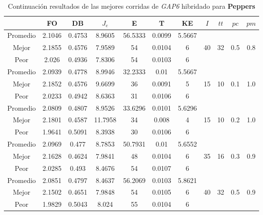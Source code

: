 \begin{table}[h!]
    \footnotesize
    \begin{center}
        \begin{tabular}{|c|c|c|c|c|c|c|c|c|c|c|}
        \hline
             & {\bf FO} & {\bf DB} & $J_e$ & {\bf E} & {\bf T} & {\bf KE} & $I$ & $tt$ & $pc$ & $pm$ \\
        \hline
        \hline
            Promedio  & 2.1046 & 0.4753 & 8.9605 & 56.5333 & 0.0099 & 5.5667 &  &  &  & \\
            \cline{1-7}
            Mejor & 2.1855 & 0.4576  & 7.9589 & 54 & 0.0104 & 6 & 40 & 32 & 0.5 & 0.8\\
            \cline{1-7}
            Peor & 2.026 & 0.4936  & 7.8306 & 54 & 0.0103 & 6 &  &  &  & \\
        \hline
        \hline
            Promedio  & 2.0939 & 0.4778 & 8.9946 & 32.2333 & 0.01 & 5.5667 &  &  &  & \\
            \cline{1-7}
            Mejor & 2.1852 & 0.4576  & 9.6699 & 36 & 0.0091 & 5 & 15 & 10 & 0.1 & 1.0\\
            \cline{1-7}
            Peor & 2.0233 & 0.4942  & 8.6363 & 31 & 0.0106 & 6 &  &  &  & \\
        \hline
        \hline
            Promedio  & 2.0809 & 0.4807 & 8.9526 & 33.6296 & 0.0101 & 5.6296 &  &  &  & \\
            \cline{1-7}
            Mejor & 2.1801 & 0.4587  & 11.7958 & 34 & 0.008 & 4 & 15 & 10 & 0.2 & 1.0\\
            \cline{1-7}
            Peor & 1.9641 & 0.5091  & 8.3938 & 30 & 0.0106 & 6 &  &  &  & \\
        \hline
        \hline
            Promedio  & 2.0969 & 0.477 & 8.7853 & 50.7931 & 0.01 & 5.6552 &  &  &  & \\
            \cline{1-7}
            Mejor & 2.1628 & 0.4624  & 7.9841 & 48 & 0.0104 & 6 & 35 & 16 & 0.3 & 0.9\\
            \cline{1-7}
            Peor & 2.0285 & 0.493  & 8.4676 & 54 & 0.0107 & 6 &  &  &  & \\
        \hline
        \hline
            Promedio  & 2.0851 & 0.4797 & 8.4637 & 56.2069 & 0.0103 & 5.8621 &  &  &  & \\
            \cline{1-7}
            Mejor & 2.1502 & 0.4651  & 7.9848 & 54 & 0.0105 & 6 & 40 & 32 & 0.5 & 0.9\\
            \cline{1-7}
            Peor & 1.9829 & 0.5043  & 8.024 & 55 & 0.0104 & 6 &  &  &  & \\
        \hline
        \end{tabular}
        \caption{Continuaci\'on resultados de las mejores corridas de \emph{GAP6} hibridado para {\bf Peppers}}
        \label{tb:tablecGAP6}
    \end{center}
\end{table}
